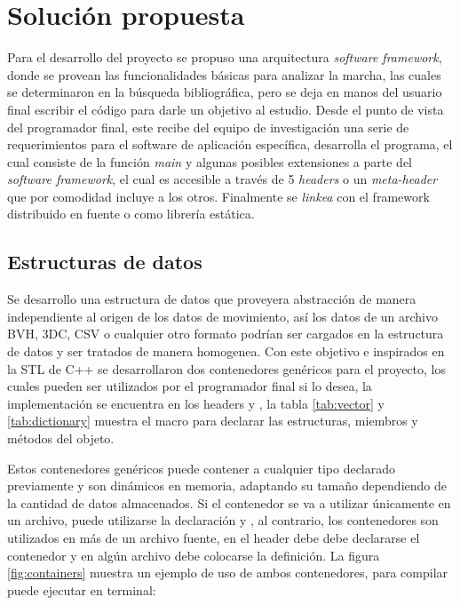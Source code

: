 \chapter{Solución propuesta}

Para el desarrollo del proyecto se propuso una arquitectura \emph{software framework}, donde se provean las funcionalidades básicas para analizar la marcha, las cuales se determinaron en la búsqueda bibliográfica, pero se deja en manos del usuario final escribir el código para darle un objetivo al estudio. Desde el punto de vista del programador final, este recibe del equipo de investigación una serie de requerimientos para el software de aplicación específica, desarrolla el programa, el cual consiste de la función \emph{main} y algunas posibles extensiones a parte del \emph{software framework}, el cual es accesible a través de 5 \emph{headers} o un \emph{meta-header} que por comodidad incluye a los otros. Finalmente se \emph{linkea} con el framework distribuido en fuente o como librería estática. 

\section{Estructuras de datos}

Se desarrollo una estructura de datos que proveyera abstracción de manera independiente al origen de los datos de movimiento, así los datos de un archivo BVH, 3DC, CSV o cualquier otro formato podrían ser cargados en la estructura de datos y ser tratados de manera homogenea. Con este objetivo e inspirados en la STL de C++ se desarrollaron dos contenedores genéricos para el proyecto, los cuales pueden ser utilizados por el programador final si lo desea, la implementación se encuentra en los headers  y , la tabla \ref{tab:vector} y \ref{tab:dictionary} muestra el macro para declarar las estructuras, miembros y métodos del objeto. 

Estos contenedores genéricos puede contener a cualquier tipo declarado previamente y son dinámicos en memoria, adaptando su tamaño dependiendo de la cantidad de datos almacenados. Si el contenedor se va a utilizar únicamente en un archivo, puede utilizarse la declaración  y , al contrario, los contenedores son utilizados en más de un archivo fuente, en el header debe debe declararse el contenedor y en algún archivo debe colocarse la definición. La figura \ref{fig:containers} muestra un ejemplo de uso de ambos contenedores, para compilar puede ejecutar en terminal:

